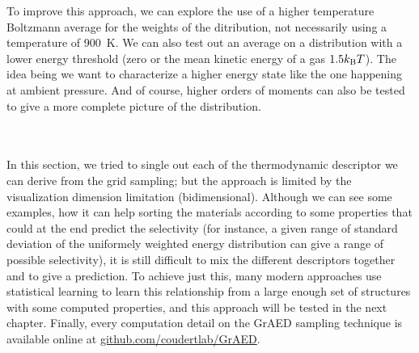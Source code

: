 \documentclass[main]{subfiles}
\begin{document}
To improve this approach, we can explore the use of a higher temperature Boltzmann average for the weights of the ditribution, not necessarily using a temperature of \SI{900}{\kelvin}. We can also test out an average on a distribution with a lower energy threshold (zero or the mean kinetic energy of a gas $1.5k_{\text{B}}T$). The idea being we want to characterize a higher energy state like the one happening at ambient pressure. And of course, higher orders of moments can also be tested to give a more complete picture of the distribution.

\\
\\

In this section, we tried to single out each of the thermodynamic descriptor we can derive from the grid sampling; but the approach is limited by the visualization dimension limitation (bidimensional). Although we can see some examples, how it can help sorting the materials according to some properties that could at the end predict the selectivity (for instance, a given range of standard deviation of the uniformely weighted energy distribution can give a range of possible selectivity), it is still difficult to mix the different descriptors together and to give a prediction. To achieve just this, many modern approaches use statistical learning to learn this relationship from a large enough set of structures with some computed properties, and this approach will be tested in the next chapter. Finally, every computation detail on the GrAED sampling technique is available online at \url{github.com/coudertlab/GrAED}.

\OnlyInSubfile{\printglobalbibliography}
\end{document}
